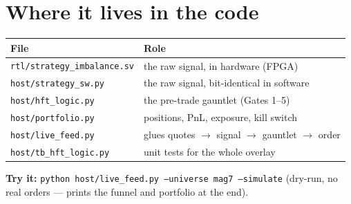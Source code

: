 \documentclass[10pt,a4paper]{article}
\newcommand{\code}[1]{\texttt{\small #1}}
\begin{document}
\section{Where it lives in the code}

\begin{center}
\begin{tabular}{ll}
\toprule
\textbf{File} & \textbf{Role} \\
\midrule
\code{rtl/strategy\_imbalance.sv}   & the raw signal, in hardware (FPGA) \\
\code{host/strategy\_sw.py}         & the raw signal, bit-identical in software \\
\code{host/hft\_logic.py}           & the pre-trade gauntlet (Gates 1--5) \\
\code{host/portfolio.py}            & positions, PnL, exposure, kill switch \\
\code{host/live\_feed.py}           & glues quotes $\to$ signal $\to$ gauntlet $\to$ order \\
\code{host/tb\_hft\_logic.py}       & unit tests for the whole overlay \\
\bottomrule
\end{tabular}
\end{center}

\textbf{Try it:} \code{python host/live\_feed.py --universe mag7 --simulate}
(dry-run, no real orders --- prints the funnel and portfolio at the end).
\end{document}
